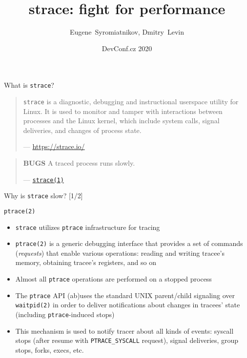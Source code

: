 \documentclass[unicode]{beamer}
\title{\Huge strace: fight for performance}
\author{Eugene~Syromiatnikov, Dmitry~Levin}
\date{DevConf.cz 2020}
\begin{document}
\begin{frame}
\titlepage
\end{frame}

\begin{frame}{What is \texttt{strace}?}
\begin{quote}
\texttt{strace} is a diagnostic, debugging and instructional userspace
utility for Linux.
It is used to monitor and tamper with interactions between processes
and the Linux kernel, which include system calls, signal deliveries,
and changes of process state.

\begin{flushright}
— \url{https://strace.io/}
\end{flushright}
\end{quote}
\pause
\begin{quote}
\textbf{BUGS}
\linebreak
A traced process runs slowly.
\begin{flushright}
— \href{http://man7.org/linux/man-pages/man1/strace.1.html\#BUGS}{\texttt{strace(1)}}
\end{flushright}
\end{quote}
\end{frame}

\begin{frame}{Why is \texttt{strace} slow? \hfill [1/2]}
\pause
\begin{block}{\large \texttt{ptrace(2)}}
\begin{itemize}
  \item \texttt{strace} utilizes \texttt{ptrace} infrastructure for tracing
  \item \texttt{ptrace(2)} is a generic debugging interface that provides
        a set of commands (\emph{requests}) that enable various operations:
	reading and writing tracee's memory, obtaining tracee's registers,
	and so on
  \item Almost all \texttt{ptrace} operations are performed on a stopped process
  \item The \texttt{ptrace} API (ab)uses the standard UNIX parent/child
        signaling over \texttt{waitpid(2)} in order to deliver notifications
	about changes in tracees' state (including \texttt{ptrace}-induced
	stops)
  \item This mechanism is used to notify tracer about all kinds of events:
        syscall stops (after resume with \texttt{PTRACE\_SYSCALL} request),
	signal deliveries, group stops, forks, execs, etc.
\end{itemize}
\end{block}
\end{frame}
\end{document}
